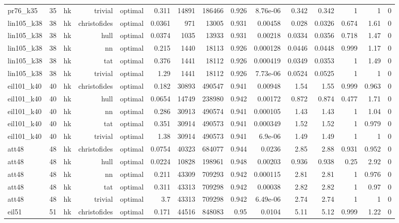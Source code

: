 \begin{tabular}{lrrrrrrrrrrrrrr}
pr76\_k35 & 35 & hk & trivial & optimal & 0.311 & 14891 & 186466 & 0.926 & 8.76e-06 & 0.342 & 0.342 & 1 & 1 & 0 \\
lin105\_k38 & 38 & hk & christofides & optimal & 0.0361 & 971 & 13005 & 0.931 & 0.00458 & 0.028 & 0.0326 & 0.674 & 1.61 & 0 \\
lin105\_k38 & 38 & hk & hull & optimal & 0.0374 & 1035 & 13933 & 0.931 & 0.00218 & 0.0334 & 0.0356 & 0.718 & 1.47 & 0 \\
lin105\_k38 & 38 & hk & nn & optimal & 0.215 & 1440 & 18113 & 0.926 & 0.000128 & 0.0446 & 0.0448 & 0.999 & 1.17 & 0 \\
lin105\_k38 & 38 & hk & tat & optimal & 0.376 & 1441 & 18112 & 0.926 & 0.000419 & 0.0349 & 0.0353 & 1 & 1.49 & 0 \\
lin105\_k38 & 38 & hk & trivial & optimal & 1.29 & 1441 & 18112 & 0.926 & 7.73e-06 & 0.0524 & 0.0525 & 1 & 1 & 0 \\
eil101\_k40 & 40 & hk & christofides & optimal & 0.182 & 30893 & 490547 & 0.941 & 0.00948 & 1.54 & 1.55 & 0.999 & 0.963 & 0 \\
eil101\_k40 & 40 & hk & hull & optimal & 0.0654 & 14749 & 238980 & 0.942 & 0.00172 & 0.872 & 0.874 & 0.477 & 1.71 & 0 \\
eil101\_k40 & 40 & hk & nn & optimal & 0.286 & 30913 & 490574 & 0.941 & 0.000105 & 1.43 & 1.43 & 1 & 1.04 & 0 \\
eil101\_k40 & 40 & hk & tat & optimal & 0.351 & 30914 & 490573 & 0.941 & 0.000349 & 1.52 & 1.52 & 1 & 0.979 & 0 \\
eil101\_k40 & 40 & hk & trivial & optimal & 1.38 & 30914 & 490573 & 0.941 & 6.9e-06 & 1.49 & 1.49 & 1 & 1 & 0 \\
att48 & 48 & hk & christofides & optimal & 0.0754 & 40323 & 684077 & 0.944 & 0.0236 & 2.85 & 2.88 & 0.931 & 0.952 & 0 \\
att48 & 48 & hk & hull & optimal & 0.0224 & 10828 & 198961 & 0.948 & 0.00203 & 0.936 & 0.938 & 0.25 & 2.92 & 0 \\
att48 & 48 & hk & nn & optimal & 0.211 & 43309 & 709293 & 0.942 & 0.000115 & 2.81 & 2.81 & 1 & 0.976 & 0 \\
att48 & 48 & hk & tat & optimal & 0.311 & 43313 & 709298 & 0.942 & 0.00038 & 2.82 & 2.82 & 1 & 0.97 & 0 \\
att48 & 48 & hk & trivial & optimal & 3.7 & 43313 & 709298 & 0.942 & 6.49e-06 & 2.74 & 2.74 & 1 & 1 & 0 \\
eil51 & 51 & hk & christofides & optimal & 0.171 & 44516 & 848083 & 0.95 & 0.0104 & 5.11 & 5.12 & 0.999 & 1.22 & 0 \\

\end{tabular}
